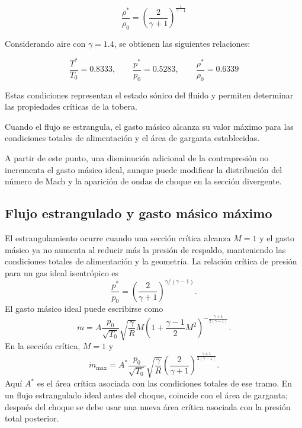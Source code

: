 \documentclass[12pt,letterpaper]{article}
\numberwithin{equation}{section}
\begin{document}
\begin{equation}
    \frac{\rho^*}{\rho_0}
    =\left(\frac{2}{\gamma+1}\right)^{
    \frac{1}{\gamma-1}}
\end{equation}

Considerando aire con $\gamma=1.4$,
se obtienen las siguientes relaciones:

\begin{equation}
    \frac{T^*}{T_0}=0.8333,
    \qquad
    \frac{p^*}{p_0}=0.5283,
    \qquad
    \frac{\rho^*}{\rho_0}=0.6339
\end{equation}

Estas condiciones representan el estado
sónico del fluido y permiten determinar
las propiedades críticas de la tobera.

Cuando el flujo se estrangula, el gasto
másico alcanza su valor máximo para
las condiciones totales de alimentación
y el área de garganta establecidas.

A partir de este punto, una disminución
adicional de la contrapresión no
incrementa el gasto másico ideal,
aunque puede modificar la distribución
del número de Mach y la aparición
de ondas de choque en la sección
divergente.


\subsection{Flujo estrangulado y gasto másico máximo}
El estrangulamiento ocurre cuando una sección crítica alcanza $M=1$ y el gasto másico ya no aumenta al reducir más la presión de respaldo, manteniendo las condiciones totales de alimentación y la geometría. La relación crítica de presión para un gas ideal isentrópico es
\begin{equation}\frac{p^*}{p_0}=\left(\frac{2}{\gamma+1}\right)^{\gamma/(\gamma-1)}.\end{equation}
El gasto másico ideal puede escribirse como
\begin{equation}
\dot m=A\frac{p_0}{\sqrt{T_0}}\sqrt{\frac{\gamma}{R}}M\left(1+\frac{\gamma-1}{2}M^2\right)^{-\frac{\gamma+1}{2(\gamma-1)}}.
\end{equation}
En la sección crítica, $M=1$ y
\begin{equation}
\dot m_{\max}=A^*\frac{p_0}{\sqrt{T_0}}\sqrt{\frac{\gamma}{R}}\left(\frac{2}{\gamma+1}\right)^{\frac{\gamma+1}{2(\gamma-1)}}.
\end{equation}
Aquí $A^*$ es el área crítica asociada con las condiciones totales de ese tramo. En un flujo estrangulado ideal antes del choque, coincide con el área de garganta; después del choque se debe usar una nueva área crítica asociada con la presión total posterior.
\end{document}
